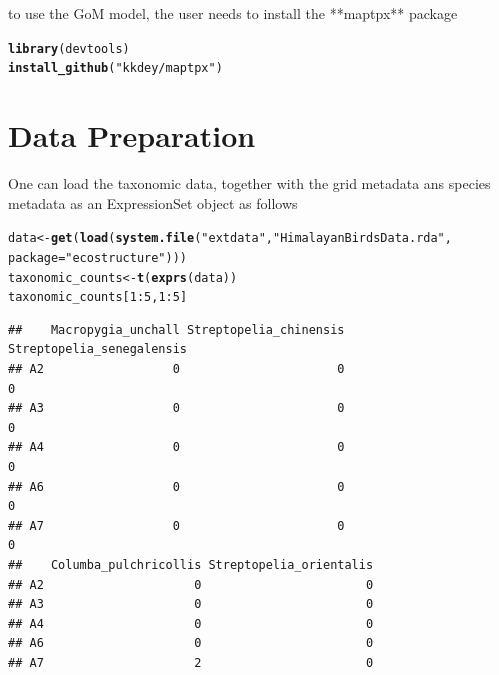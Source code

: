 \documentclass[12pt]{article}\usepackage[]{graphicx}\usepackage[usenames,dvipsnames]{color}
\makeatletter
\newcommand{\hlnum}[1]{\textcolor[rgb]{0.686,0.059,0.569}{#1}}%
\newcommand{\hlstr}[1]{\textcolor[rgb]{0.192,0.494,0.8}{#1}}%
\newcommand{\hlopt}[1]{\textcolor[rgb]{0,0,0}{#1}}%
\newcommand{\hlstd}[1]{\textcolor[rgb]{0.345,0.345,0.345}{#1}}%
\newcommand{\hlkwb}[1]{\textcolor[rgb]{0.69,0.353,0.396}{#1}}%
\newcommand{\hlkwc}[1]{\textcolor[rgb]{0.333,0.667,0.333}{#1}}%
\newcommand{\hlkwd}[1]{\textcolor[rgb]{0.737,0.353,0.396}{\textbf{#1}}}%
\newenvironment{kframe}{%
 \def\at@end@of@kframe{}%
 \ifinner\ifhmode%
  \def\at@end@of@kframe{\end{minipage}}%
  \begin{minipage}{\columnwidth}%
 \fi\fi%
 \def\FrameCommand##1{\hskip\@totalleftmargin \hskip-\fboxsep
 \colorbox{shadecolor}{##1}\hskip-\fboxsep
     \hskip-\linewidth \hskip-\@totalleftmargin \hskip\columnwidth}%
 \MakeFramed {\advance\hsize-\width
   \@totalleftmargin\z@ \linewidth\hsize
   \@setminipage}}%
 {\par\unskip\endMakeFramed%
 \at@end@of@kframe}
\newenvironment{knitrout}{}{} %
\makeatother
\begin{document}
to use the GoM model, the user needs to install the **maptpx** package

\begin{knitrout}
\color{fgcolor}\begin{kframe}
\begin{alltt}
\hlkwd{library}\hlstd{(devtools)}
\hlkwd{install_github}\hlstd{(}\hlstr{"kkdey/maptpx"}\hlstd{)}
\end{alltt}
\end{kframe}
\end{knitrout}


\section{Data Preparation}

One can load the taxonomic data, together with the grid metadata ans species metadata as an ExpressionSet object as follows

\begin{knitrout}
\color{fgcolor}\begin{kframe}
\begin{alltt}
\hlstd{data} \hlkwb{<-} \hlkwd{get}\hlstd{(}\hlkwd{load}\hlstd{(}\hlkwd{system.file}\hlstd{(}\hlstr{"extdata"}\hlstd{,} \hlstr{"HimalayanBirdsData.rda"}\hlstd{,}
                             \hlkwc{package} \hlstd{=} \hlstr{"ecostructure"}\hlstd{)))}
\hlstd{taxonomic_counts} \hlkwb{<-} \hlkwd{t}\hlstd{(}\hlkwd{exprs}\hlstd{(data))}
\hlstd{taxonomic_counts[}\hlnum{1}\hlopt{:}\hlnum{5}\hlstd{,}\hlnum{1}\hlopt{:}\hlnum{5}\hlstd{]}
\end{alltt}
\begin{verbatim}
##    Macropygia_unchall Streptopelia_chinensis Streptopelia_senegalensis
## A2                  0                      0                         0
## A3                  0                      0                         0
## A4                  0                      0                         0
## A6                  0                      0                         0
## A7                  0                      0                         0
##    Columba_pulchricollis Streptopelia_orientalis
## A2                     0                       0
## A3                     0                       0
## A4                     0                       0
## A6                     0                       0
## A7                     2                       0
\end{verbatim}
\end{kframe}
\end{knitrout}
\end{document}
